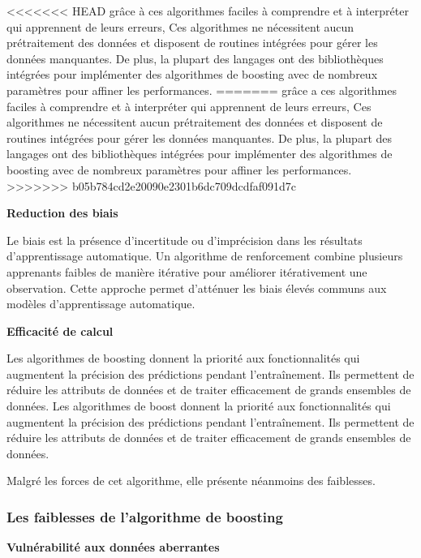 \documentclass[french,a4paper,12pt]{article}
\begin{document}
<<<<<<< HEAD
\quad  grâce à ces algorithmes faciles à comprendre et à interpréter qui apprennent de leurs erreurs, Ces algorithmes ne nécessitent aucun prétraitement des données et disposent de routines intégrées pour gérer les données manquantes\citep{AWS}. De plus, la plupart des langages ont des bibliothèques intégrées pour implémenter des algorithmes de boosting avec de nombreux paramètres pour affiner les performances.
=======
\quad  grâce a ces algorithmes faciles à comprendre et à interpréter qui apprennent de leurs erreurs, Ces algorithmes ne nécessitent aucun prétraitement des données et disposent de routines intégrées pour gérer les données manquantes\citep{AWS}. De plus, la plupart des langages ont des bibliothèques intégrées pour implémenter des algorithmes de boosting avec de nombreux paramètres pour affiner les performances.
>>>>>>> b05b784cd2e20090e2301b6dc709dcdfaf091d7c



\textbf{Reduction des biais }



\quad Le biais est la présence d'incertitude ou d'imprécision dans les résultats d'apprentissage automatique. Un algorithme de renforcement combine plusieurs apprenants faibles de manière itérative pour améliorer itérativement une observation. Cette approche permet d'atténuer les biais élevés communs aux modèles d'apprentissage automatique.




\textbf{Efficacité de calcul }


\quad Les algorithmes de boosting donnent la priorité aux fonctionnalités qui augmentent la précision des prédictions pendant l'entraînement. Ils permettent de réduire les attributs de données et de traiter efficacement de grands ensembles de données. Les algorithmes de boost donnent la priorité aux fonctionnalités qui augmentent la précision des prédictions pendant l'entraînement. Ils permettent de réduire les attributs de données et de traiter efficacement de grands ensembles de données.

\quad Malgré les forces de cet algorithme, elle présente néanmoins des faiblesses. 


\subsubsection{Les faiblesses de l'algorithme de boosting}

\textbf{Vulnérabilité aux données aberrantes }
\end{document}
